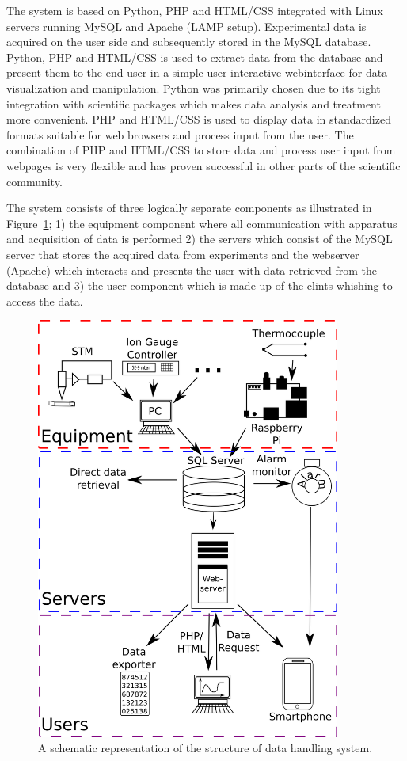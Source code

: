 The system is based on Python, PHP and HTML/CSS integrated with Linux servers
running MySQL and Apache (LAMP setup). Experimental data is acquired on the
user side and subsequently stored in the MySQL database. Python, PHP and
HTML/CSS is used to extract data from the database and present them to the end
user in a simple user interactive webinterface for data visualization and
manipulation. Python was primarily chosen due to its tight integration with
scientific packages which makes data analysis and treatment more
convenient\cite{Cahn2007}. PHP and HTML/CSS is used to display data in
standardized formats suitable for web browsers and process input from the user.
The combination of PHP and HTML/CSS to store data and process user input from
webpages is very flexible and has proven successful in other parts of the
scientific community\cite{Crane2008}.

The system consists of three logically separate components as illustrated in
Figure~\ref{fig:system_overview}; 1) the equipment component where all
communication with apparatus and acquisition of data is performed 2) the
servers which consist of the MySQL server that stores the acquired data from
experiments and the webserver (Apache) which interacts and presents the user with data
retrieved from the database and 3) the user component which is made up of the
clints whishing to access the data. \begin{figure}
 \begin{center}
 \includegraphics[width=10cm]{system_overview.png}
 \caption{
   A schematic representation of the structure of data handling system.
   \label{fig:system_overview}
 } 
 \end{center}
\end{figure}

